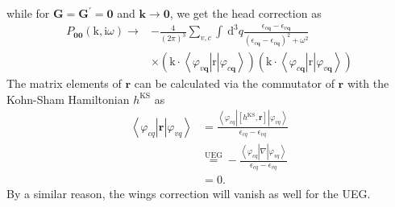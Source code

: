 while for $\mathbf{G}=\mathbf{G}^{\prime}=\mathbf{0}$ and $\mathbf{k} \rightarrow \mathbf{0}$, we get the head correction as
\begin{align}
    P_{\mathbf{0 0}}(\mathrm{k}, \mathrm{i} \omega) \rightarrow & -\frac{4}{(2 \pi)^3} \sum_{v, c} \int \mathrm{~d}^3 q \frac{\epsilon_{c \mathbf{q}}-\epsilon_{v \mathbf{q}}}{\left(\epsilon_{c \mathbf{q}}-\epsilon_{v \mathbf{q}}\right)^2+\omega^2} \\
& \times\left(\mathrm{k} \cdot\left\langle\varphi_{v \mathbf{q}}\right| \mathrm{r}\left|\varphi_{c \mathbf{q}}\right\rangle\right)\left(\mathrm{k} \cdot\left\langle\varphi_{c \mathbf{q}}\right| \mathrm{r}\left|\varphi_{v \mathbf{q}}\right\rangle\right)
\end{align}
The matrix elements of $\mathbf{r}$ can be calculated via the commutator of $\mathbf{r}$ with the Kohn-Sham Hamiltonian $h^{\mathrm{KS}}$ as
\begin{align}
    \left\langle\varphi_{c q}\right| \mathbf{r}\left|\varphi_{v q}\right\rangle&=\frac{\left\langle\varphi_{c q}\right|\left[h^{\mathrm{KS}}, \mathbf{r}\right]\left|\varphi_{v q}\right\rangle}{\epsilon_{c q}-\epsilon_{v q}} \\
&\overset{\text{UEG}}{=}-\frac{\left\langle\varphi_{c q}\right| \nabla\left|\varphi_{v q}\right\rangle}{\epsilon_{c q}-\epsilon_{v q}}\\
&=0.
\end{align}
By a similar reason, the wings correction will vanish as well for the UEG.
